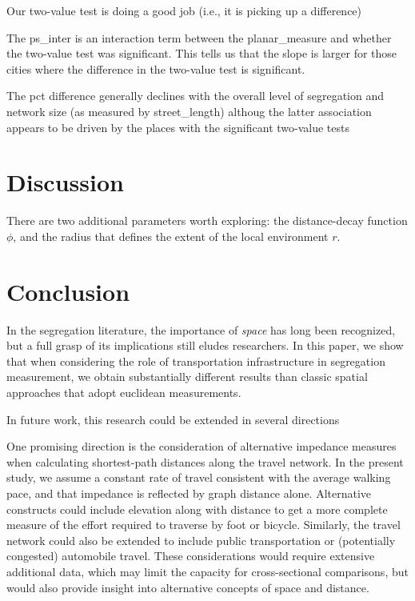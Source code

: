 \documentclass[
  10pt,
]{article}
\begin{document}
Our two-value test is doing a good job (i.e., it is picking up a
difference)

The ps\_inter is an interaction term between the planar\_measure and
whether the two-value test was significant. This tells us that the slope
is larger for those cities where the difference in the two-value test is
significant.

The pct difference generally declines with the overall level of
segregation and network size (as measured by street\_length) althoug the
latter association appears to be driven by the places with the
significant two-value tests

\hypertarget{discussion}{%
\section{Discussion}\label{discussion}}

There are two additional parameters worth exploring: the distance-decay
function \(\phi\), and the radius that defines the extent of the local
environment \(r\).

\hypertarget{conclusion}{%
\section{Conclusion}\label{conclusion}}

In the segregation literature, the importance of \emph{space} has long
been recognized, but a full grasp of its implications still eludes
researchers. In this paper, we show that when considering the role of
transportation infrastructure in segregation measurement, we obtain
substantially different results than classic spatial approaches that
adopt euclidean measurements.

In future work, this research could be extended in several directions

One promising direction is the consideration of alternative impedance
measures when calculating shortest-path distances along the travel
network. In the present study, we assume a constant rate of travel
consistent with the average walking pace, and that impedance is
reflected by graph distance alone. Alternative constructs could include
elevation along with distance to get a more complete measure of the
effort required to traverse by foot or bicycle. Similarly, the travel
network could also be extended to include public transportation or
(potentially congested) automobile travel. These considerations would
require extensive additional data, which may limit the capacity for
cross-sectional comparisons, but would also provide insight into
alternative concepts of space and distance.
\end{document}

